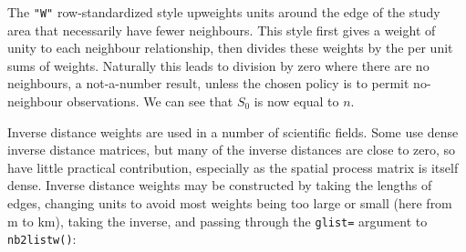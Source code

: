 \documentclass[]{book}
\newenvironment{Shaded}{\begin{snugshade}}{\end{snugshade}}
\newcommand{\CommentTok}[1]{\textcolor[rgb]{0.56,0.35,0.01}{\textit{#1}}}
\newcommand{\DataTypeTok}[1]{\textcolor[rgb]{0.13,0.29,0.53}{#1}}
\newcommand{\KeywordTok}[1]{\textcolor[rgb]{0.13,0.29,0.53}{\textbf{#1}}}
\newcommand{\NormalTok}[1]{#1}
\newcommand{\OperatorTok}[1]{\textcolor[rgb]{0.81,0.36,0.00}{\textbf{#1}}}
\newcommand{\StringTok}[1]{\textcolor[rgb]{0.31,0.60,0.02}{#1}}
\begin{document}
\begin{Shaded}
\end{Shaded}

The \texttt{"W"} row-standardized style upweights units around the edge of the study area that necessarily have fewer neighbours. This style first gives a weight of unity to each neighbour relationship, then divides these weights by the per unit sums of weights. Naturally this leads to division by zero where there are no neighbours, a not-a-number result, unless the chosen policy is to permit no-neighbour observations. We can see that \(S_0\) is now equal to \(n\).

\begin{Shaded}
\end{Shaded}

Inverse distance weights are used in a number of scientific fields. Some use dense inverse distance matrices, but many of the inverse distances are close to zero, so have little practical contribution, especially as the spatial process matrix is itself dense. Inverse distance weights may be constructed by taking the lengths of edges, changing units to avoid most weights being too large or small (here from m to km), taking the inverse, and passing through the \texttt{glist=} argument to \texttt{nb2listw()}:
\end{document}
